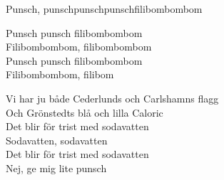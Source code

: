 \begin{song}{Punsch, punsch}{punschpunschfilibombombom}
\begin{vers}
Punsch punsch filibombombom\\
Filibombombom, filibombombom\\
Punsch punsch filibombombom\\
Filibombombom, filibom\\
\end{vers}
\begin{vers}
Vi har ju både Cederlunds och Carlshamns flagg\\
Och Grönstedts blå och lilla Caloric\\
Det blir för trist med sodavatten\\
Sodavatten, sodavatten\\
Det blir för trist med sodavatten\\
Nej, ge mig lite punsch\\
\end{vers}
\end{song}

